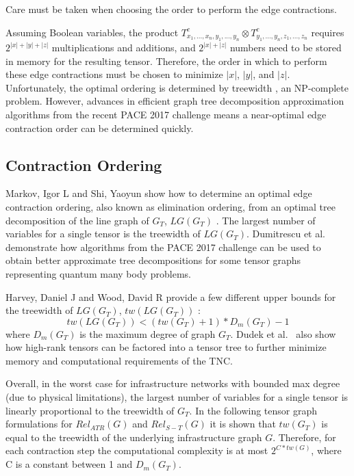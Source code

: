 Care must be taken when choosing the order to perform the edge contractions.

Assuming Boolean variables, the product \(T^c_{x_1,...,x_n,y_1,...,y_n} \otimes T^c_{y_1,...,y_n,z_1,...,z_n}\) requires \(2^{|x|+|y|+|z|}\) multiplications and additions, and \(2^{|x|+|z|}\) numbers need to be stored in memory for the resulting tensor. Therefore, the order in which to perform these edge contractions must be chosen to minimize \(|x|\), \(|y|\), and \(|z|\). Unfortunately, the optimal ordering is determined by treewidth \cite{markov2008simulating}, an NP-complete problem. However, advances in efficient graph tree decomposition approximation algorithms from the recent PACE 2017 challenge \cite{dell2018pace} means a near-optimal edge contraction order can be determined quickly.

\hypertarget{contraction-ordering}{%
\subsection{Contraction Ordering}\label{contraction-ordering}}

Markov, Igor L and Shi, Yaoyun show how to determine an optimal edge contraction ordering, also known as elimination ordering, from an optimal tree decomposition of the line graph of \(G_T\), \(LG(G_T)\) \cite{markov2008simulating}. The largest number of variables for a single tensor is the treewidth of \(LG(G_T)\). Dumitrescu et al.~\cite{dumitrescu2018benchmarking} demonstrate how algorithms from the PACE 2017 challenge \cite{dell2018pace} can be used to obtain better approximate tree decompositions for some tensor graphs representing quantum many body problems.

Harvey, Daniel J and Wood, David R provide a few different upper bounds for the treewidth of \(LG(G_T)\), \(tw(LG(G_T))\) \cite{harvey2018treewidth}: \begin{equation*}
tw(LG(G_T))<(tw(G_T)+1)*D_m(G_T)-1
\end{equation*} where \(D_m(G_T)\) is the maximum degree of graph \(G_T\). Dudek et al.~\cite{dudek2019efficient} also show how high-rank tensors can be factored into a tensor tree to further minimize memory and computational requirements of the TNC.

Overall, in the worst case for infrastructure networks with bounded max degree (due to physical limitations), the largest number of variables for a single tensor is linearly proportional to the treewidth of \(G_T\). In the following tensor graph formulations for \(Rel_{ATR}(G)\) and \(Rel_{S-T}(G)\) it is shown that \(tw(G_T)\) is equal to the treewidth of the underlying infrastructure graph \(G\). Therefore, for each contraction step the computational complexity is at most \(2^{C*tw(G)}\), where C is a constant between 1 and \(D_m(G_T)\).

